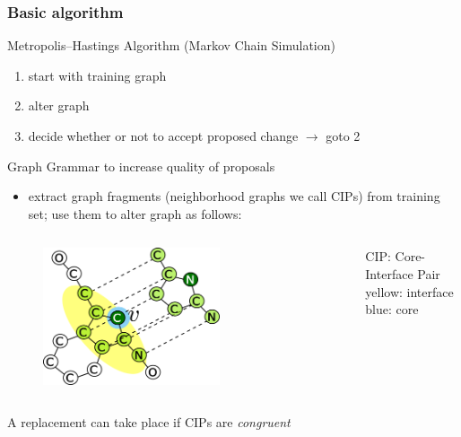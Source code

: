 \documentclass{beamer}
\begin{document}
\begin{frame}
    \frametitle{Basic algorithm}
    Metropolis--Hastings Algorithm (Markov Chain Simulation)
    \begin{enumerate}
        \item start with training graph
        \item alter graph
        \item decide whether or not to accept proposed change $\rightarrow$ goto 2
    \end{enumerate}
    \pause
    Graph Grammar to increase quality of proposals
    \begin{itemize}
        \item extract graph fragments (neighborhood graphs we call
            CIPs) from training set;
            use them to alter graph as follows:
    \end{itemize}

    \begin{columns}
    \begin{figure}[ht]
        \centering
        \includegraphics[width=0.66\textwidth]{images/CIP_replacement.png}
    \end{figure}
        CIP: Core-Interface Pair\\
        yellow: interface\\
        blue: core
    \end{columns}
    
    \small{A replacement can take place if CIPs are \emph{congruent}  }
\end{frame}
\end{document}
